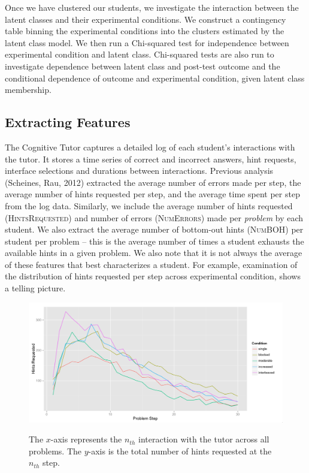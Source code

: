 \documentclass{edm_template}
\newcommand{\ftr}[1]{\textsc{#1}}
\begin{document}
Once we have clustered our students, we investigate the interaction between the latent classes and their experimental conditions. We construct a contingency table binning the experimental conditions into the clusters estimated by the latent class model. We then run a Chi-squared test for independence between experimental condition and latent class. Chi-squared tests are also run to investigate dependence between latent class and post-test outcome and the conditional dependence of outcome and experimental condition, given latent class membership.

\subsection{Extracting Features}
The Cognitive Tutor captures a detailed log of each student's interactions with the tutor. It stores a time series of correct and incorrect answers, hint requests, interface selections and durations between interactions. Previous analysis (Scheines, Rau, 2012) extracted the average number of errors made per step, the average number of hints requested per step, and the average time spent per step from the log data. Similarly, we include the average number of hints requested (\ftr{HintsRequested}) and number of errors (\ftr{NumErrors}) made per \emph{problem} by each student. We also extract the average number of bottom-out hints (\ftr{NumBOH}) per student per problem -- this is the average number of times a student exhausts the available hints in a given problem. We also note that it is not always the average of these features that best characterizes a student. For example, examination of the distribution of hints requested per step across experimental condition, shows a telling picture. 
\begin{figure}[htbp]
\centering
\includegraphics[scale=.45]{hintsByCondition.png}\\
\caption{The $x$-axis represents the $n_{th}$ interaction with the tutor across all problems. The $y$-axis is the total number of hints requested at the $n_{th}$ step.  }
\label{fig:condition-graph}
\end{figure}
\end{document}
